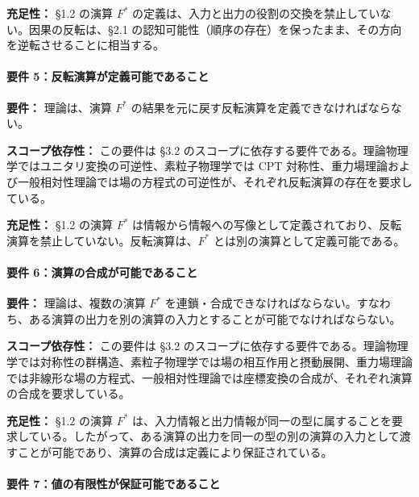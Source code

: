 \documentclass[a4paper,11pt]{ltjsarticle}
\begin{document}
\textbf{充足性：} §1.2 の演算 \(F^*\)
の定義は、入力と出力の役割の交換を禁止していない。因果の反転は、§2.1
の認知可能性（順序の存在）を保ったまま、その方向を逆転させることに相当する。

\paragraph{要件
5：反転演算が定義可能であること}\label{ux8981ux4ef6-5ux53cdux8ee2ux6f14ux7b97ux304cux5b9aux7fa9ux53efux80fdux3067ux3042ux308bux3053ux3068}

\textbf{要件：} 理論は、演算 \(F^*\)
の結果を元に戻す反転演算を定義できなければならない。

\textbf{スコープ依存性：} この要件は §3.2
のスコープに依存する要件である。理論物理学ではユニタリ変換の可逆性、素粒子物理学では
CPT
対称性、重力場理論および一般相対性理論では場の方程式の可逆性が、それぞれ反転演算の存在を要求している。

\textbf{充足性：} §1.2 の演算 \(F^*\)
は情報から情報への写像として定義されており、反転演算を禁止していない。反転演算は、\(F^*\)
とは別の演算として定義可能である。

\paragraph{要件
6：演算の合成が可能であること}\label{ux8981ux4ef6-6ux6f14ux7b97ux306eux5408ux6210ux304cux53efux80fdux3067ux3042ux308bux3053ux3068}

\textbf{要件：} 理論は、複数の演算 \(F^*\)
を連鎖・合成できなければならない。すなわち、ある演算の出力を別の演算の入力とすることが可能でなければならない。

\textbf{スコープ依存性：} この要件は §3.2
のスコープに依存する要件である。理論物理学では対称性の群構造、素粒子物理学では場の相互作用と摂動展開、重力場理論では非線形な場の方程式、一般相対性理論では座標変換の合成が、それぞれ演算の合成を要求している。

\textbf{充足性：} §1.2 の演算 \(F^*\)
は、入力情報と出力情報が同一の型に属することを要求している。したがって、ある演算の出力を同一の型の別の演算の入力として渡すことが可能であり、演算の合成は定義により保証されている。

\paragraph{要件
7：値の有限性が保証可能であること}\label{ux8981ux4ef6-7ux5024ux306eux6709ux9650ux6027ux304cux4fddux8a3cux53efux80fdux3067ux3042ux308bux3053ux3068}
\end{document}
